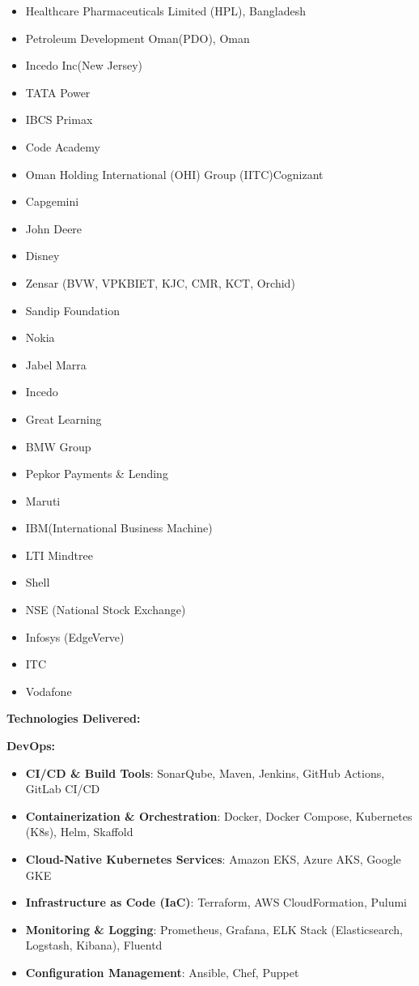\documentclass[a4paper]{article}
\begin{document}
\begin{itemize}
\item
  Healthcare Pharmaceuticals Limited (HPL), Bangladesh
\item
  Petroleum Development Oman(PDO), Oman
\item
  Incedo Inc(New Jersey)
\item
  TATA Power
\item
  IBCS Primax
\item
  Code Academy
\item
  Oman Holding International (OHI) Group (IITC)Cognizant
\item
  Capgemini
\item
  John Deere
\item
  Disney
\item
  Zensar (BVW, VPKBIET, KJC, CMR, KCT, Orchid)
\item
  Sandip Foundation
\item
  Nokia
\item
  Jabel Marra
\item
  Incedo
\item
  Great Learning
\item
  BMW Group
\item
  Pepkor Payments \& Lending
\item
  Maruti
\item
  IBM(International Business Machine)
\item
  LTI Mindtree
\item
  Shell
\item
  NSE (National Stock Exchange)
\item
  Infosys (EdgeVerve)
\item
  ITC
\item
  Vodafone
\end{itemize}

\textbf{Technologies Delivered:}

\textbf{DevOps:}

\begin{itemize}
\item
  \textbf{CI/CD \& Build Tools}: SonarQube, Maven, Jenkins, GitHub
  Actions, GitLab CI/CD
\item
  \textbf{Containerization \& Orchestration}: Docker, Docker Compose,
  Kubernetes (K8s), Helm, Skaffold
\item
  \textbf{Cloud-Native Kubernetes Services}: Amazon EKS, Azure AKS,
  Google GKE
\item
  \textbf{Infrastructure as Code (IaC)}: Terraform, AWS CloudFormation,
  Pulumi
\item
  \textbf{Monitoring \& Logging}: Prometheus, Grafana, ELK Stack
  (Elasticsearch, Logstash, Kibana), Fluentd
\item
  \textbf{Configuration Management}: Ansible, Chef, Puppet
\end{itemize}
\end{document}
